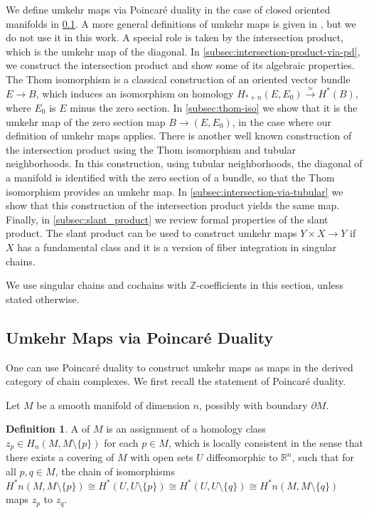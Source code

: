 \documentclass{scrartcl}
\let\emph\relax
\theoremstyle{plain}
\theoremstyle{definition}
\newtheorem{definition}[theorem]{Definition}
\newcommand{\R}{\mathbb R}
\newcommand{\Z}{\mathbb Z}
\newcommand{\iso}{\cong}
\newcommand{\quiso}{\simeq}
\let\xto\xrightarrow
\begin{document}
We define umkehr maps via Poincaré duality in the case of closed oriented manifolds in \cref{subsec:umkehr_maps_via_pd}. A more general definitions of umkehr maps is given in \cite{cohen2009umkehr}, but we do not use it in this work. A special role is taken by the intersection product, which is the umkehr map of the diagonal. In \cref{subsec:intersection-product-via-pd}, we construct the intersection product and show some of its algebraic properties. The Thom isomorphism is a classical construction of an oriented vector bundle $E\to B$, which induces an isomorphism on homology $H_{*+n}(E, E_0) \xto{\quiso} H^{*}(B)$, where $E_0$ is $E$ minus the zero section. In \cref{subsec:thom-iso} we show that it is the umkehr map of the zero section map $B\to (E, E_0)$, in the case where our definition of umkehr maps applies. There is another well known construction of the intersection product using the Thom isomorphism and tubular neighborhoods. In this construction, using tubular neighborhoods, the diagonal of a manifold is identified with the zero section of a bundle, so that the Thom isomorphism provides an umkehr map. In \cref{subsec:intersection-via-tubular} we show that this construction of the intersection product yields the same map. Finally, in \cref{subsec:slant_product} we review formal properties of the slant product. The slant product can be used to construct umkehr maps $Y\times X\to Y$ if $X$ has a fundamental class and it is a version of fiber integration in singular chains. 

We use singular chains and cochains with $\Z$-coefficients in this section, unless stated otherwise.


\subsection{Umkehr Maps via Poincaré Duality} \label{subsec:umkehr_maps_via_pd}

One can use Poincaré duality to construct umkehr maps as maps in the derived category of chain complexes. We first recall the statement of Poincaré duality. 

Let $M$ be a smooth manifold of dimension $n$, possibly with boundary $\partial M$. 

\begin{definition}
    A \emph{homological orientation} of $M$ is an assignment of a homology class $z_p\in H_n(M, M\setminus \{p\})$ for each $p\in M$, which is locally consistent in the sense that there exists a covering of $M$ with open sets $U$ diffeomorphic to $\R^n$, such that for all $p, q\in M$, the chain of isomorphisms $H^*n(M, M\setminus\{p\})\iso H^*(U, U\setminus\{p\})\iso H^*(U, U\setminus\{q\}) \iso H^*n(M, M\setminus\{q\})$ maps $z_p$ to $z_q$. 
\end{definition}
\end{document}
